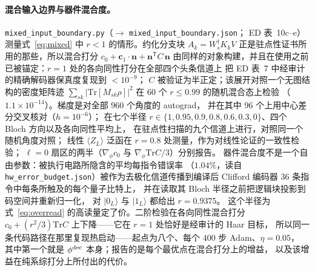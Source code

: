 \documentclass[11pt,a4paper]{article}
\newcommand{\ket}[1]{\lvert #1\rangle}
\newcommand{\tr}{\mathrm{Tr}}
\begin{document}
\paragraph{混合输入边界与器件混合度。}
\texttt{mixed\_input\_boundary.py}（$\to$ \texttt{mixed\_input\_boundary.json}；
ED 表~10c--e）测量式~\eqref{eq:mixed} 中 $r<1$ 的情形。约化分支块
$A_k=W_s^\dagger K_kV$ 正是驻点性证书所用的那些，所以混合打分
$c_0+\mathbf c_1\!\cdot\!\mathbf n+\mathbf n^{\mathsf T}C\,\mathbf n$
由同样的对象构建，并且在使用之前已被锚定：$r=1$ 处的各向同性打分在全部四个头条信道上
把 ED 表~7 中经审计的精确解码器保真度复现到 $<10^{-9}$；
$C$ 被验证为半正定；该展开对照一个无图结构的密度矩阵迹
$\sum_{sk}|\tr[M_{sk}\rho]|^2$ 在 $60$ 个 $r\le0.99$ 的随机混合态上检验
（$1.1\times10^{-14}$）。梯度是对全部 $960$ 个角度的 autograd，
并在其中 $96$ 个上用中心差分交叉核对（$h=10^{-6}$）；
在七个半径 $r\in\{1,0.95,0.9,0.8,0.6,0.3,0\}$、四个 Bloch 方向以及各向同性平均上，
在驻点性扫描的九个信道上进行，对照同一个随机角度对照；
线性 $\langle Z_L\rangle$ 泛函在 $r=0.8$ 处测量，作为对线性论证的一致性检验；
$\ell=0$ 扇区的两半（$\nabla_\phi c_0$ 与 $\nabla_\phi\tr C/3$）分别报告。
器件混合度不是一个自由参数：被执行电路所隐含的平均每指令错误率
（$1.04\%$，读自 \texttt{hw\_error\_budget.json}）被作为去极化信道传播到编译后 Clifford
编码器 $36$ 条指令中每条所触及的每个量子比特上，
并在读取其 Bloch 半径之前把逻辑块投影到码空间并重新归一化，
对 $\ket{0_L}$ 与 $\ket{1_L}$ 都给出 $r=0.9375$。
这个半径为式~\eqref{eq:overread} 的高读量定了价。二阶检验在各向同性混合打分
$c_0+(r^2/3)\tr C$ 上下降——它在 $r=1$ 处恰好是经审计的 Haar 目标，
所以同一条代码路径在那里复现热启动——起点为八个、每个 $400$ 步 Adam、$\eta=0.05$，
其中第一个就是 $\phi^{\rm dec}$ 本身；报告的是每个最优点在混合打分上的增益，
以及该增益在纯系综打分上所付出的代价。
\end{document}
